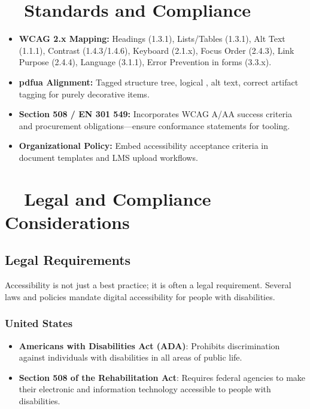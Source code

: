 \section{~~Standards and Compliance}\label{ch15:sec:standards-compliance}
\begin{itemize}
	\item \textbf{WCAG 2.x Mapping:} Headings (1.3.1), Lists/Tables (1.3.1), Alt Text (1.1.1), Contrast (1.4.3/1.4.6), Keyboard  (2.1.x), Focus Order (2.4.3), Link Purpose (2.4.4), Language (3.1.1), Error Prevention in forms (3.3.x).
	\item \textbf{\gls{pdfua} Alignment:} Tagged structure tree, logical , alt text, correct artifact tagging for purely decorative items.
	\item \textbf{Section 508 / EN 301 549:} Incorporates WCAG A/AA success criteria and procurement obligations—ensure conformance statements for tooling.
	\item \textbf{Organizational Policy:} Embed accessibility acceptance criteria in document templates and LMS upload workflows.
\end{itemize}

\section{~~Legal and Compliance Considerations}\label{ch15:sec:legal-compliance}

\subsection{Legal Requirements}\label{ch15:ssec:legal-reqs}
Accessibility is not just a best practice; it is often a legal requirement. Several laws and policies mandate digital accessibility for people with disabilities.

\subsubsection{United States}\label{ch15:sssec:legal-us}
\begin{itemize}
	\item \textbf{Americans with Disabilities Act (ADA)}: Prohibits discrimination against individuals with disabilities in all areas of public life.
	\item \textbf{Section 508 of the Rehabilitation Act}: Requires federal agencies to make their electronic and information technology accessible to people with disabilities.
\end{itemize}

